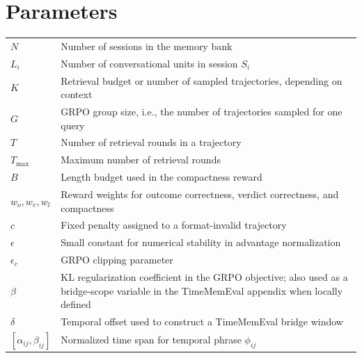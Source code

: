 \section*{Parameters}
\renewcommand*{\arraystretch}{1.35}
\begin{longtable}{p{}p{}}
$N$ & Number of sessions in the memory bank\\
$L_i$ & Number of conversational units in session $S_i$\\
$K$ & Retrieval budget or number of sampled trajectories, depending on context\\
$G$ & GRPO group size, i.e., the number of trajectories sampled for one query\\
$T$ & Number of retrieval rounds in a trajectory\\
$T_{\max}$ & Maximum number of retrieval rounds\\
$B$ & Length budget used in the compactness reward\\
$w_o,w_v,w_l$ & Reward weights for outcome correctness, verdict correctness, and compactness\\
$c$ & Fixed penalty assigned to a format-invalid trajectory\\
$\epsilon$ & Small constant for numerical stability in advantage normalization\\
$\epsilon_c$ & GRPO clipping parameter\\
$\beta$ & KL regularization coefficient in the GRPO objective; also used as a bridge-scope variable in the TimeMemEval appendix when locally defined\\
$\delta$ & Temporal offset used to construct a TimeMemEval bridge window\\
$[\alpha_{ij},\beta_{ij}]$ & Normalized time span for temporal phrase $\phi_{ij}$\\
\end{longtable}

